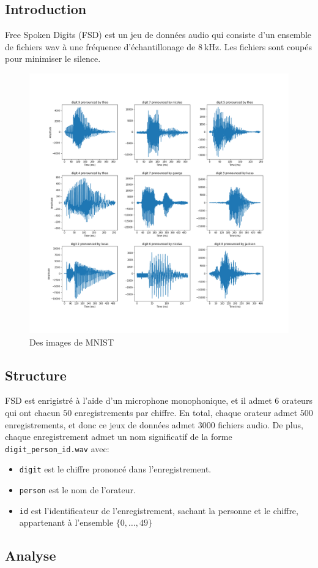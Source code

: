 \subsection{Introduction}
Free Spoken Digits\cite{13} (FSD) est un jeu de données audio qui consiste d'un ensemble de fichiers wav à une fréquence d'échantillonage de $8 \ \text{kHz}$. Les fichiers sont coupés pour minimiser le silence.
\begin{figure}[h!]
	\centering
	\includegraphics[width=.7\textwidth]{Figures/free-spoken-digits-4.png}
	\caption{Des images de MNIST}
	\label{fig:FreeSpokenDigits-Sample}
\end{figure}
\newpage
\subsection{Structure}
FSD est enrigistré à l'aide d'un microphone monophonique, et il admet $6$ orateurs qui ont chacun $50$ enregistrements par chiffre.
\newline En total, chaque orateur admet $500$ enregistrements, et donc ce jeux de données admet $3000$ fichiers audio.
\newline De plus, chaque enregistrement admet un nom significatif de la forme \texttt{digit\_person\_id.wav} avec:
\begin{itemize}
	\item \texttt{digit} est le chiffre prononcé dans l'enregistrement.
	\item \texttt{person} est le nom de l'orateur.
	\item \texttt{id} est l'identificateur de l'enregistrement, sachant la personne et le chiffre, appartenant à l'ensemble $\{0,\dots,49\}$
\end{itemize}
\subsection{Analyse}
